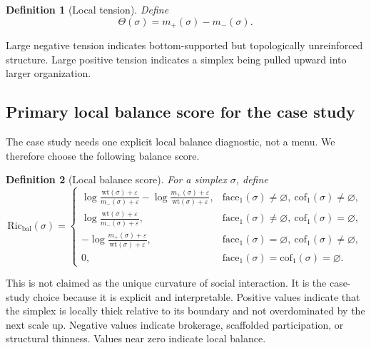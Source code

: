 \documentclass[11pt]{article}
\newtheorem{definition}{Definition}[section]
\newcommand{\eps}{\varepsilon}
\newcommand{\wt}{\mathrm{wt}}
\newcommand{\Ric}{\mathrm{Ric}}
\newcommand{\cof}{\mathrm{cof}}
\newcommand{\face}{\mathrm{face}}
\begin{document}
\begin{definition}[Local tension]
Define
\[
\Theta(\sigma)=m_+(\sigma)-m_-(\sigma).
\]
\end{definition}

Large negative tension indicates bottom-supported but topologically unreinforced structure. Large positive tension indicates a simplex being pulled upward into larger organization.

\subsection{Primary local balance score for the case study}

The case study needs one explicit local balance diagnostic, not a menu. We therefore choose the following balance score.

\begin{definition}[Local balance score]
For a simplex $\sigma$, define
\[
\Ric_{\mathrm{bal}}(\sigma)=
\begin{cases}
\log\!\frac{\wt(\sigma)+\eps}{m_-(\sigma)+\eps}
-\log\!\frac{m_+(\sigma)+\eps}{\wt(\sigma)+\eps}, & \face_1(\sigma)\neq \varnothing,\ \cof_1(\sigma)\neq \varnothing,\\[1em]
\log\!\frac{\wt(\sigma)+\eps}{m_-(\sigma)+\eps}, & \face_1(\sigma)\neq \varnothing,\ \cof_1(\sigma)=\varnothing,\\[1em]
-\log\!\frac{m_+(\sigma)+\eps}{\wt(\sigma)+\eps}, & \face_1(\sigma)=\varnothing,\ \cof_1(\sigma)\neq \varnothing,\\[1em]
0, & \face_1(\sigma)=\cof_1(\sigma)=\varnothing.
\end{cases}
\]
\end{definition}

This is not claimed as the unique curvature of social interaction. It is the case-study choice because it is explicit and interpretable. Positive values indicate that the simplex is locally thick relative to its boundary and not overdominated by the next scale up. Negative values indicate brokerage, scaffolded participation, or structural thinness. Values near zero indicate local balance.
\end{document}
